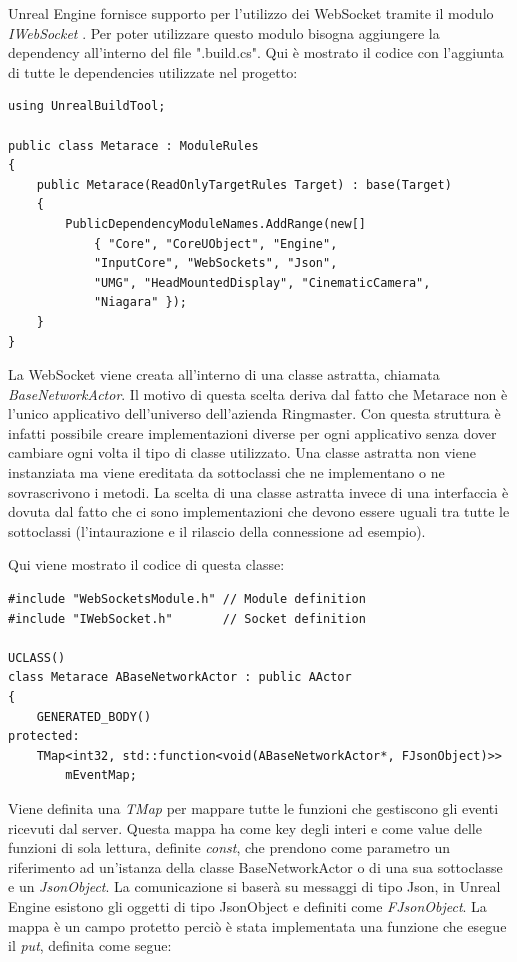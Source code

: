 Unreal Engine fornisce supporto per l'utilizzo dei WebSocket tramite il modulo \textit{IWebSocket} \cite{UWebSocket}. Per poter utilizzare questo modulo bisogna aggiungere la dependency all'interno del file ".build.cs". Qui è mostrato il codice con l'aggiunta di tutte le dependencies utilizzate nel progetto:

\begin{lstlisting}[caption = Metarace.build.cs file]
using UnrealBuildTool;

public class Metarace : ModuleRules
{
	public Metarace(ReadOnlyTargetRules Target) : base(Target)
	{
		PublicDependencyModuleNames.AddRange(new[]
			{ "Core", "CoreUObject", "Engine", 
            "InputCore", "WebSockets", "Json", 
            "UMG", "HeadMountedDisplay", "CinematicCamera", 
            "Niagara" });
	}
}
\end{lstlisting}

La WebSocket viene creata all'interno di una classe astratta, chiamata \textit{BaseNetworkActor}.
%
Il motivo di questa scelta deriva dal fatto che Metarace non è l'unico applicativo dell'universo dell'azienda Ringmaster.
%
Con questa struttura è infatti possibile creare implementazioni diverse per ogni applicativo senza dover cambiare ogni volta il tipo di classe utilizzato.
%
Una classe astratta non viene instanziata ma viene ereditata da sottoclassi che ne implementano o ne sovrascrivono i metodi.
%
La scelta di una classe astratta invece di una interfaccia è dovuta dal fatto che ci sono implementazioni che devono essere uguali tra tutte le sottoclassi (l'intaurazione e il rilascio della connessione ad esempio).

Qui viene mostrato il codice di questa classe:

\begin{lstlisting}[caption = Sezione del file header di BaseNetworkActor dove vengono importati i moduli necessari alla WebSocket e viene definita la mappa degli eventi]
#include "WebSocketsModule.h" // Module definition
#include "IWebSocket.h"       // Socket definition

UCLASS()
class Metarace ABaseNetworkActor : public AActor
{
    GENERATED_BODY()
protected:
    TMap<int32, std::function<void(ABaseNetworkActor*, FJsonObject)>> 
        mEventMap;
\end{lstlisting}

Viene definita una \textit{TMap} per mappare tutte le funzioni che gestiscono gli eventi ricevuti dal server.
%
Questa mappa ha come key degli interi e come value delle funzioni di sola lettura, definite \textit{const}, che prendono come parametro un riferimento ad un'istanza della classe BaseNetworkActor o di una sua sottoclasse e un \textit{JsonObject}.
%
La comunicazione si baserà su messaggi di tipo Json, in Unreal Engine esistono gli oggetti di tipo JsonObject e definiti come \textit{FJsonObject}.
%
La mappa è un campo protetto perciò è stata implementata una funzione che esegue il \textit{put}, definita come segue:

